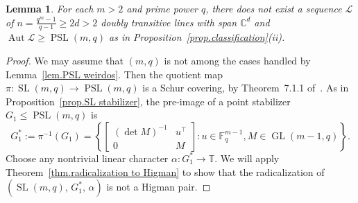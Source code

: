 \documentclass[11pt]{article}
\newtheorem{lemma}[theo]{Lemma}
\theoremstyle{definition}
\numberwithin{equation}{section}
\begin{document}
\begin{lemma}
For each $m > 2$ and prime power $q$, there does not exist a sequence $\mathscr{L}$ of $n = \frac{q^m-1}{q-1} \geq 2d > 2$ doubly transitive lines with span $\mathbb{C}^d$ and $\operatorname{Aut} \mathscr{L} \geq \operatorname{PSL}(m,q)$ as in Proposition~\ref{prop.classification}(ii).
\end{lemma}

\begin{proof}
We may assume that $(m,q)$ is not among the cases handled by Lemma~\ref{lem.PSL weirdos}.
Then the quotient map $\pi \colon \operatorname{SL}(m,q) \to \operatorname{PSL}(m,q)$ is a Schur covering, by Theorem~7.1.1 of~\cite{Karpilovsky:87}.
As in Proposition~\ref{prop.SL stabilizer}, the pre-image of a point stabilizer $G_1 \leq \operatorname{PSL}(m,q)$ is
\[ G_1^* := \pi^{-1}(G_1) =\left\{
\begin{bmatrix}
(\det M)^{-1}&u^\top\\0&M
\end{bmatrix}
: u\in\mathbb{F}_q^{m-1},M\in\operatorname{GL}(m-1,q)
\right\}.
\]
Choose any nontrivial linear character $\alpha \colon G_1^* \to \mathbb{T}$.
We will apply Theorem~\ref{thm.radicalization to Higman} to show that the radicalization of $(\operatorname{SL}(m,q),\, G_1^*,\, \alpha)$ is not a Higman pair.


\end{proof}
\end{document}
